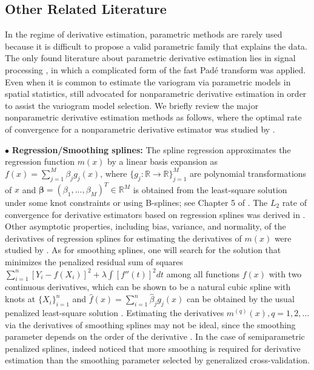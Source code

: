 \documentclass{uwstat572}
\theoremstyle{definition}
\renewcommand{\hat}{\widehat}
\theoremstyle{theorem}
\begin{document}
\subsection{Other Related Literature}
\label{Sec:related_work}

In the regime of derivative estimation, parametric methods are rarely used because it is difficult to propose a valid parametric family that explains the data. The only found literature about parametric derivative estimation lies in signal processing \citep{belkic2018validation}, in which a complicated form of the fast Pad\'e transform was applied. Even when it is common to estimate the variogram via parametric models in spatial statistics, \cite{gorsich2000variogram} still advocated for nonparametric derivative estimation in order to assist the variogram model selection. We briefly review the major nonparametric derivative estimation methods as follows, where the optimal rate of convergence for a nonparametric derivative estimator was studied by \cite{stone1980optimal,stone1982optimal}. 

$\bullet$ {\bf Regression/Smoothing splines:} The spline regression \citep{deboor1968splines} approximates the regression function $m(x)$ by a linear basis expansion as $f(x) = \sum_{j=1}^M \beta_j g_j(x)$, where $\{g_j:\mathbb{R}\to \mathbb{R}\}_{j=1}^M$ are polynomial transformations of $x$ and $\bm{\beta} = (\beta_1,...,\beta_M)^T \in \mathbb{R}^M$ is obtained from the least-square solution under some knot constraints or using B-splines; see Chapter 5 of \cite{hastie2009elements}. The $L_2$ rate of convergence for derivative estimators based on regression splines was derived in \cite{stone1985additive}. Other asymptotic properties, including bias, variance, and normality, of the derivatives of regression splines for estimating the derivatives of $m(x)$ were studied by \cite{zhou2000derivative}. As for smoothing splines, one will search for the solution that minimizes the penalized residual sum of squares $\sum_{i=1}^n \left[Y_i-f(X_i)\right]^2 + \lambda \int \left[f''(t)\right]^2 dt$ among all functions $f(x)$ with two continuous derivatives, which can be shown to be a natural cubic spline with knots at $\{X_i\}_{i=1}^n$ and $\hat{f}(x)=\sum_{i=1}^n \hat{\beta}_j g_j(x)$ can be obtained by the usual penalized least-square solution \citep{hastie2009elements}. Estimating the derivatives $m^{(q)}(x), q=1,2,...$ via the derivatives of smoothing splines may not be ideal, since the smoothing parameter depends on the order of the derivative \citep{wahba1990optimal}. In the case of semiparametric penalized splines, \cite{jarrow2004estimating} indeed noticed that more smoothing is required for derivative estimation than the smoothing parameter selected by generalized cross-validation.
\end{document}
